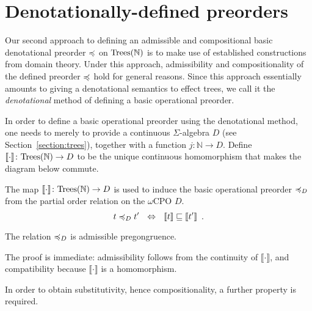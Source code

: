 \section{Denotationally-defined preorders}
\label{section:denotational}

Our second approach to defining an admissible and compositional basic
denotational 
preorder $\preccurlyeq$ on $\textnormal{Trees}(\mathbb{N})$ is to make use of established constructions from domain theory.
Under this approach, admissibility and compositionality of the defined preorder $\preccurlyeq$ hold
for general reasons. Since this approach essentially amounts to giving a denotational semantics to effect trees, we call it the \emph{denotational} method of defining a basic operational preorder.



In order to define a basic operational preorder using the denotational method, one needs to merely to provide
a continuous $\Sigma$-algebra $D$ (see Section~\ref{section:trees}),  together with a function
$j\colon \mathbb{N} \to D$. 
Define   $\llbracket \cdot \rrbracket \colon \textnormal{Trees}(\mathbb{N}) \to D$ to be the unique continuous homomorphism that makes the diagram below commute.
   \begin{center}
    \end{center}
\noindent
The map $\llbracket \cdot \rrbracket \colon \textnormal{Trees}(\mathbb{N}) \to D$ is used to induce
the basic operational preorder $\preccurlyeq_D$ from the partial order relation on the $\omega$CPO $D$.
\[
t \preccurlyeq_D t' ~~ \Leftrightarrow ~~ \llbracket t \rrbracket \sqsubseteq \llbracket t'  \rrbracket \enspace .
\]
\begin{proposition}
The relation $\preccurlyeq_D$ is admissible pregongruence.
\end{proposition}
%
The proof is immediate: admissibility follows from the continuity of 
$\llbracket \cdot \rrbracket$, and compatibility because  $\llbracket \cdot \rrbracket$ is a homomorphism.

In order to obtain substitutivity, hence compositionality, a further property is required.

